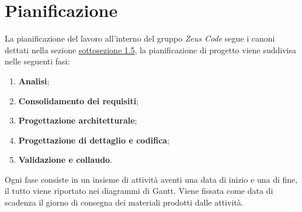 \section{Pianificazione}
La pianificazione del lavoro all'interno del gruppo \textit{Zeus Code} segue i canoni dettati nella sezione \hyperlink{scadenze}{sottosezione 1.5}, la pianificazione di progetto viene suddivisa nelle seguenti fasi:
\begin{enumerate}
	\item \textbf{Analisi};
	\item \textbf{Consolidamento dei requisiti};
	\item \textbf{Progettazione architetturale};
	\item \textbf{Progettazione di dettaglio e codifica};
	\item \textbf{Validazione e collaudo}.
\end{enumerate}
Ogni fase consiste in un insieme di attività aventi una data di inizio e una di fine, il tutto viene riportato nei diagrammi di Gantt\glo. Viene fissata come data di scadenza il giorno di consegna dei materiali prodotti dalle attività. 
